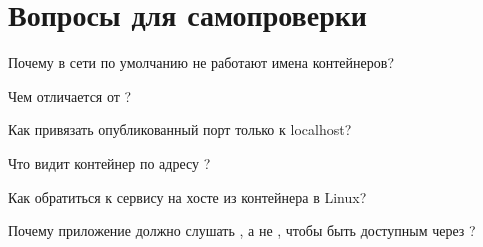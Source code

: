 \section*{Вопросы для самопроверки}
\begin{selfcheck}
  \item Почему в сети  по умолчанию не работают имена
        контейнеров?
  \item Чем  отличается от ?
  \item Как привязать опубликованный порт только к localhost?
  \item Что видит контейнер по адресу ?
  \item Как обратиться к сервису на хосте из контейнера в Linux?
  \item Почему приложение должно слушать , а не
        , чтобы быть доступным через ?
\end{selfcheck}
